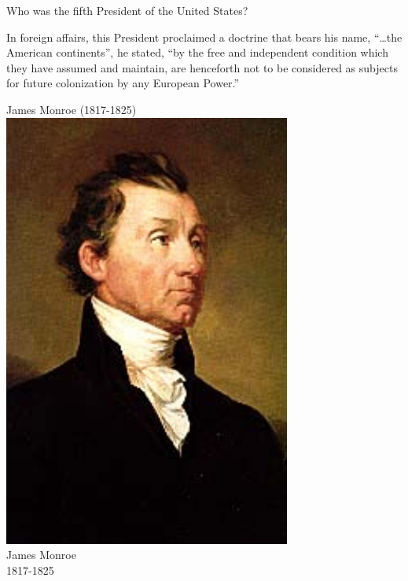 \documentclass{article}
\def\rescale{.4} %
\begin{document}
\useNoHints

\begin{card}
    Who was the fifth President of the United States?
    \begin{response}
        \begin{hint}
            In foreign affairs, this President proclaimed a doctrine that
            bears his name, ``\dots the American continents'', he stated, ``by the
            free and independent condition which they have assumed and
            maintain, are henceforth not to be considered as subjects for
            future colonization by any European Power.''
        \end{hint}
        \begin{answer}
        \ifecListing
            James Monroe (1817-1825)
        \else\centering
            \includegraphics[scale=\rescale]{presidents/jm5}\\
            James Monroe\\
            1817-1825
        \fi
        \end{answer}
    \end{response}
\end{card}
\end{document}
